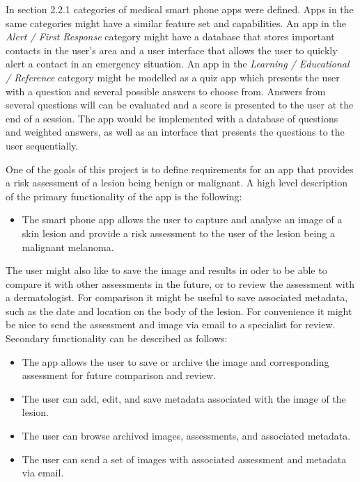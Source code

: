 In section 2.2.1 categories of medical smart phone apps were defined. Apps in the same categories might have a similar feature set and capabilities. An app in the \textit{Alert / First Response} category might have a database that stores important contacts in the user’s area and a user interface that allows the user to quickly alert a contact in an emergency situation. An app in the \textit{Learning / Educational / Reference} category might be modelled as a quiz app which presents the user with a question and several possible answers to choose from. Answers from several questions will can be evaluated and a score is presented to the user at the end of a session. The app would be implemented with a database of questions and weighted answers, as well as an interface that presents the questions to the user sequentially.

One of the goals of this project is to define requirements for an app that provides a risk assessment of a lesion being benign or malignant. A high level description of the primary functionality of the app is the following:

\begin{itemize}[label={}]
\item The smart phone app allows the user to capture and analyse an image of a skin lesion and provide a risk assessment to the user of the lesion being a malignant melanoma.

\end{itemize}

The user might also like to save the image and results in oder to be able to compare it with other assessments in the future, or to review the assessment with a dermatologist. For comparison it might be useful to save associated metadata, such as the date and location on the body of the lesion. For convenience it might be nice to send the assessment and image via email to a specialist for review.
Secondary functionality can be described as follows:

\begin{itemize}[label={}]
\item The app allows the user to save or archive the image and corresponding assessment for future comparison and review.

\item The user can add, edit, and save metadata associated with the image of the lesion.
\item The user can browse archived images, assessments, and associated metadata.
\item The user can send a set of images with associated assessment and metadata via email.

\end{itemize}

